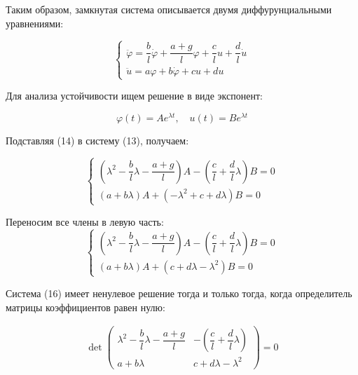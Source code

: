 \documentclass[12pt]{article}
\begin{document}
Таким образом, замкнутая система описывается двумя диффурунциальными уравнениями:

\begin{equation}
\begin{cases}
\ddot{\varphi} = \dfrac{b}{l} \dot{\varphi} + \dfrac{a+g}{l} \varphi + \dfrac{c}{l} u + \dfrac{d}{l} \dot{u} \\ 
\ddot{u} = a\varphi + b\dot{\varphi} + cu + du 
\end{cases}
\end{equation}

Для анализа устойчивости ищем решение в виде экспонент:

\begin{equation}
\varphi(t) = Ae^{\lambda t}, \quad u(t) = Be^{\lambda t}
\end{equation}

Подставляя (14) в систему (13), получаем:

\begin{equation}
\begin{cases}
\left(\lambda^2 - \dfrac{b}{l}\lambda - \dfrac{a+g}{l}\right)A - \left(\dfrac{c}{l} + \dfrac{d}{l}\lambda\right)B = 0 \\[1em]
\left(a + b\lambda\right)A + \left(-\lambda^2 + c + d\lambda\right)B = 0
\end{cases}
\end{equation}

Переносим все члены в левую часть:
\begin{equation}
\begin{cases} 
\left( \lambda^2 - \dfrac{b}{l} \lambda - \dfrac{a + g}{l} \right) A - \left( \dfrac{c}{l} + \dfrac{d}{l} \lambda \right) B = 0 \\ 
(a + b\lambda)A + (c + d\lambda - \lambda^2)B = 0 
\end{cases}
\end{equation}

Система (16) имеет ненулевое решение тогда и только тогда, когда определитель матрицы коэффициентов равен нулю:

\begin{gather}
\det 
\begin{pmatrix} 
\lambda^2 - \dfrac{b}{l} \lambda - \dfrac{a + g}{l} & -\left( \dfrac{c}{l} + \dfrac{d}{l} \lambda \right) \\ 
a + b\lambda & c + d\lambda - \lambda^2 
\end{pmatrix} = 0
\end{gather}
\end{document}
